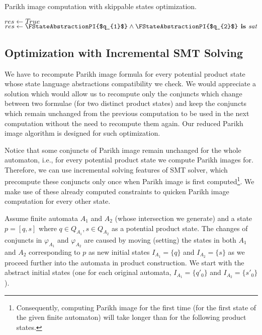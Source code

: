 \begin{algorithm}
\caption{Parikh image computation with skippable states optimization.}\label{productConstructionParikhImageAlgorithmAddingSkippableStates}
\DontPrintSemicolon
\BlankLine
    \eIf{$\FIsSkippable{$[q_1, q_2]$}$} {
        $res \gets True$ \;
    } { %
        $res \gets \FStateAbstractionPI{$q_{1}$} \land \FStateAbstractionPI{$q_{2}$} \textbf{ is } \emph{sat} $ \;
    }
\end{algorithm}

\subsection{Optimization with Incremental SMT Solving}

We have to recompute Parikh image formula for every potential product state whose state language abstractions compatibility we check. We would appreciate a solution which would allow us to recompute only the conjuncts which change between two formulae (for two distinct product states) and keep the conjuncts which remain unchanged from the previous computation to be used in the next computation without the need to recompute them again. Our reduced Parikh image algorithm is designed for such optimization.

Notice that some conjuncts of Parikh image remain unchanged for the whole automaton, i.e., for every potential product state we compute Parikh images for. Therefore, we can use incremental solving features of SMT solver, which precompute these conjuncts only once when Parikh image is first computed\footnote{Consequently, computing Parikh image for the first time (for the first state of the given finite automaton) will take longer than for the following product states.}. We make use of these already computed constraints to quicken Parikh image computation for every other state.

Assume finite automata $A_1$ and $A_2$ (whose intersection we generate) and a state $p = [q, s]$ where $q \in Q_{A_1}, s \in Q_{A_2}$ as a potential product state. The changes of conjuncts in $\varphi_{A_1}$ and $\varphi_{A_2}$ are caused by moving (setting) the states in both $A_1$ and $A_2$ corresponding to $p$ as new initial states $I_{A_1} = \{q\}$ and $I_{A_2} = \{s\}$ as we proceed further into the automata in product construction. We start with the abstract initial states (one for each original automata, $I_{A_1} = \{q'_0\}$ and $I_{A_2} = \{s'_0\}$).

